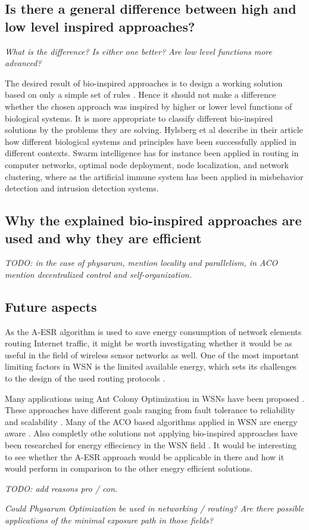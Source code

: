 \documentclass{IWORK2014}
\begin{document}
\subsection{Is there a general difference between high and low level inspired approaches?}
\textit{What is the difference? Is either one better? Are low level functions more advanced?}

The desired result of bio-inspired approaches is to design a working solution based on only a simple set of rules \cite{dressler2010bio}. Hence it should not make a difference whether the chosen approach was inspired by higher or lower level functions of biological systems. It is more appropriate to classify different bio-inspired solutions by the problems they are solving. Hylsberg et al describe in their article \cite{hylsberg2011bioinspired} how different biological systems and principles have been successfully applied in different contexts. Swarm intelligence has for instance been applied in routing in computer networks, optimal node deployment, node localization, and network clustering, where as the artificial immune system has been applied in misbehavior detection and intrusion detection systems.

\subsection{Why the explained bio-inspired approaches are used and why they are efficient}
\textit{TODO: in the case of physarum, mention locality and parallelism, in ACO mention decentralized control and self-organization.}

\subsection{Future aspects}
As the A-ESR algorithm is used to save energy consumption of network elements routing Internet traffic, it might be worth investigating whether it would be as useful in the field of wireless sensor networks as well. One of the most important limiting factors in WSN is the limited available energy, which sets its challenges to the design of the used routing protocols \cite{hylsberg2011bioinspired}.

Many applications using Ant Colony Optimization in WSNs have been proposed \cite{bennis2013enhanced, zhang2004improvements, camilo2006energy, cai2006aco, sun2008asar, kiri2007self, ghasemaghaei2007ant}. These approaches have different goals ranging from fault tolerance \cite{zhang2004improvements} to reliability and scalability \cite{kiri2007self}. Many of the ACO based algorithms applied in WSN are energy aware \cite{saleem2011swarm}. Also completly othe solutions not applying bio-inspired approaches have been researched for energy effieciency in the WSN field \cite{wightman2008a3}. It would be interesting to see whether the A-ESR approach would be applicable in there and how it would perform in comparison to the other enegry efficient solutions.

\textit{TODO: add reasons pro / con.}

\textit{Could Physarum Optimization be used in networking / routing? Are there possible applications of the minimal exposure path in those fields?}



\end{document}
